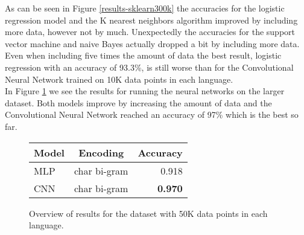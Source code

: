 As can be seen in Figure \ref{results-sklearn300k} the accuracies for the logistic regression model and the K nearest neighbors algorithm improved by including more data, however not by much. Unexpectedly the accuracies for the support vector machine and naive Bayes actually dropped a bit by including more data.\\

Even when including five times the amount of data the best result, logistic regression with an accuracy of 93.3\%, is still worse than for the Convolutional Neural Network trained on 10K data points in each language.\\

In Figure \ref{results-keras-300k} we see the results for running the neural networks on the larger dataset. Both models improve by increasing the amount of data and the Convolutional Neural Network reached an accuracy of 97\% which is the best so far.

\begin{figure}[h!]
  \centering
  \begin{tabular}{ l c | r }
    \hline
    Model               & Encoding & Accuracy \\
    \hline
    MLP                 & char bi-gram  & 0.918\\
    CNN                 & char bi-gram  & \textbf{0.970}\\
    \hline
  \end{tabular}
  \caption{Overview of results for the dataset with 50K data points in each language.}
  \label{results-keras-300k}
\end{figure}




